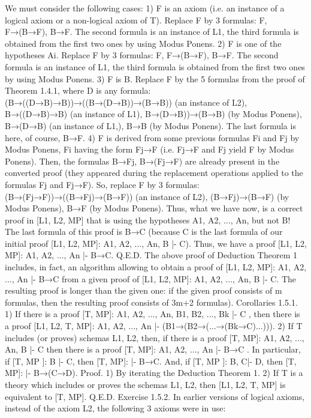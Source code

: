 We must consider the following cases:
1) F is an axiom (i.e. an instance of a logical axiom or a non-logical axiom of T). Replace F by 3
formulas: F, F→(B→F), B→F. The second formula is an instance of L1, the third formula is obtained
from the first two ones by using Modus Ponens.
2) F is one of the hypotheses Ai. Replace F by 3 formulas: F, F→(B→F), B→F. The second formula is an
instance of L1, the third formula is obtained from the first two ones by using Modus Ponens.
3) F is B. Replace F by the 5 formulas from the proof of Theorem 1.4.1, where D is any formula:
(B→((D→B)→B))→((B→(D→B))→(B→B)) (an instance of L2),
B→((D→B)→B) (an instance of L1),
B→(D→B))→(B→B) (by Modus Ponens),
B→(D→B) (an instance of L1,),
B→B (by Modus Ponens).
The last formula is here, of course, B→F.
4) F is derived from some previous formulas Fi and Fj by Modus Ponens, Fi having the form Fj→F (i.e.
Fj→F and Fj yield F by Modus Ponens). Then, the formulas
B→Fj,
B→(Fj→F)
are already present in the converted proof (they appeared during the replacement operations applied to the
formulas Fj and Fj→F). So, replace F by 3 formulas:
(B→(Fj→F))→((B→Fj)→(B→F)) (an instance of L2),
(B→Fj)→(B→F) (by Modus Ponens),
B→F (by Modus Ponens).
Thus, what we have now, is a correct proof in [L1, L2, MP] that is using the hypotheses A1, A2, ..., An, but
not B! The last formula of this proof is B→C (because C is the last formula of our initial proof [L1, L2,
MP]: A1, A2, ..., An, B |- C). Thus, we have a proof [L1, L2, MP]: A1, A2, ..., An |- B→C. Q.E.D.
The above proof of Deduction Theorem 1 includes, in fact, an algorithm allowing to obtain a proof of
[L1, L2, MP]: A1, A2, ..., An |- B→C from a given proof of [L1, L2, MP]: A1, A2, ..., An, B |- C. The
resulting proof is longer than the given one: if the given proof consists of m formulas, then the resulting
proof consists of 3m+2 formulas).
Corollaries 1.5.1. 1) If there is a proof [T, MP]: A1, A2, ..., An, B1, B2, ..., Bk |- C , then there is a proof
[L1, L2, T, MP]: A1, A2, ..., An |- (B1→(B2→(...→(Bk→C)...))).
2) If T includes (or proves) schemas L1, L2, then, if there is a proof [T, MP]: A1, A2, ..., An, B |- C then
there is a proof [T, MP]: A1, A2, ..., An |- B→C .
In particular, if [T, MP ]: B |- C, then [T, MP]: |- B→C.
And, if [T, MP ]: B, C|- D, then [T, MP]: |- B→(C→D).
Proof. 1) By iterating the Deduction Theorem 1.
2) If T is a theory which includes or proves the schemas L1, L2, then [L1, L2, T, MP] is equivalent to [T,
MP]. Q.E.D.
Exercise 1.5.2. In earlier versions of logical axioms, instead of the axiom L2, the following 3 axioms
were in use:
